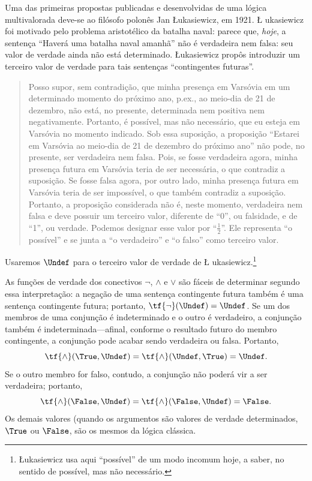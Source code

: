 \documentclass[../../../include/open-logic-section]{subfiles}
\begin{document}


Uma das primeiras propostas publicadas e desenvolvidas de uma lógica
multivalorada deve-se ao filósofo polonês Jan \L ukasiewicz, em 1921. \L
ukasiewicz foi motivado pelo problema aristotélico da batalha naval: parece
que, \emph{hoje}, a sentença ``Haverá uma batalha naval
amanhã'' não é verdadeira nem falsa: seu valor de verdade ainda não está
determinado. \L ukasiewicz propôs introduzir um terceiro valor de verdade
para tais sentenças ``contingentes futuras''.
\begin{quote}
Posso supor, sem contradição, que minha presença em Varsóvia em um
determinado momento do próximo ano, p.ex., ao meio-dia de 21 de dezembro, não está,
no presente, determinada nem positiva nem negativamente. Portanto, é
possível, mas não necessário, que eu esteja em Varsóvia no momento
indicado. Sob essa suposição, a proposição ``Estarei em Varsóvia
ao meio-dia de 21 de dezembro do próximo ano'' não pode, no presente,
ser verdadeira nem falsa. Pois, se fosse verdadeira agora, minha presença futura em
Varsóvia teria de ser necessária, o que contradiz a
suposição. Se fosse falsa agora, por outro lado, minha presença futura
em Varsóvia teria de ser impossível, o que também
contradiz a suposição. Portanto, a proposição considerada
não é, neste momento, verdadeira nem falsa e deve possuir um terceiro
valor, diferente de ``0'', ou falsidade, e de ``1'', ou verdade. Podemos
designar esse valor por ``$\frac{1}{2}$''. Ele representa ``o possível''
e se junta a ``o verdadeiro'' e ``o falso'' como terceiro valor.
\end{quote}
Usaremos $\Undef$ para o terceiro valor de verdade de \L
ukasiewicz.\footnote{\L ukasiewicz usa aqui ``possível'' de um modo
incomum hoje, a saber, no sentido de possível, mas não necessário.}

As funções de verdade dos conectivos $\lnot$, $\land$ e $\lor$
são fáceis de determinar segundo essa interpretação: a negação de uma sentença
contingente futura também é uma sentença contingente futura; portanto,
$\tf{\lnot}(\Undef) = \Undef$. Se um dos membros de uma
conjunção é indeterminado e o outro é verdadeiro, a conjunção também é
indeterminada---afinal, conforme o resultado futuro do membro
contingente, a conjunção pode acabar sendo verdadeira ou
falsa. Portanto, 
\[
    \tf{\land}(\True, \Undef) =
\tf{\land}(\Undef, \True) =
\Undef.
\]
Se o outro membro for falso, contudo, a conjunção não poderá
vir a ser verdadeira; portanto, \[\tf{\land}(\False, \Undef) =
\tf{\land}(\False, \Undef) = \False.\]
Os demais valores (quando os argumentos são valores de verdade determinados, $\True$
ou $\False$, são os mesmos da lógica clássica.
\end{document}
